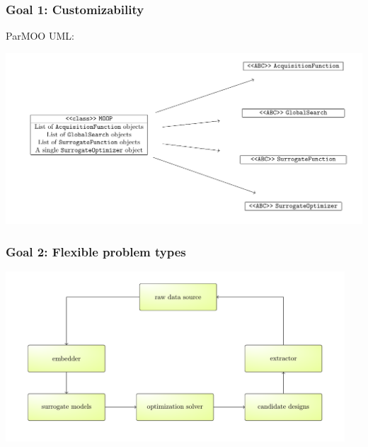\documentclass[aspectratio=169]{beamer}
\begin{document}
\begin{frame}\frametitle{Goal 1: Customizability}
ParMOO UML:\\
\begin{center}
\includegraphics[width=\textwidth]{../img/moo_new/uml-diagram-1.pdf}
\end{center}
\end{frame}

\begin{frame}\frametitle{Goal 2: Flexible problem types}
\begin{center}
\includegraphics[width=0.95\textwidth]{../img/moo_new/embedder-extractor.pdf}
\end{center}
\end{frame}
\end{document}
